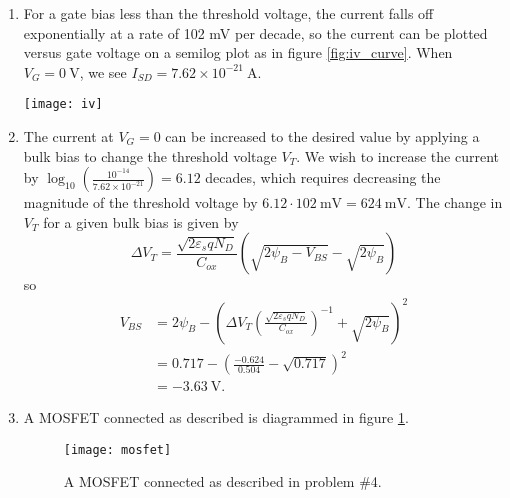 \documentclass{article}
\begin{document}
\begin{enumerate}
{\begin{align*}
                &= -1.746 ~\mathrm{V}.
        \end{align*} 
       }
   \item{For a gate bias less than the threshold voltage, the current falls 
         off exponentially at a rate of 102 mV per decade, so the current can 
         be plotted versus gate voltage on a semilog plot as in figure 
         \ref{fig:iv_curve}. When $V_G = 0 ~\mathrm{V}$, we see 
         $I_{SD} = 7.62 \times 10^{-21} ~\mathrm{A}$.
         \begin{sidewaysfigure}
           \texttt{[image: iv]}
           \caption{Drain current versus gate bias for problem \#4. \label{fig:iv_curve}}
         \end{sidewaysfigure}}
   \item{The current at $V_G = 0$ can be increased to the desired value by 
         applying a bulk bias to change the threshold voltage $V_T$. We wish to
         increase the current by 
         $\log_{10}\left(\frac{10^{-14}}{7.62 \times 10^{-21}}\right) = 6.12$ decades,
         which requires decreasing the magnitude of the threshold voltage by 
         $6.12 \cdot 102 ~\mathrm{mV} = 624 ~\mathrm{mV}$. The change in $V_T$ for a
         given bulk bias is given by
         $$
         \Delta V_{T} = \frac{\sqrt{2 \varepsilon_s q N_D}}
                               {C_{ox}}
                          (\sqrt{2 \psi_B - V_{BS}} - \sqrt{2 \psi_B}) 
         $$
         so
         \begin{align*}
         V_{BS} &= 2\psi_B - \left(\Delta V_{T}\left(\frac{\sqrt{2 \varepsilon_s q N_D}}{C_{ox}}\right)^{-1} + \sqrt{2 \psi_B}\right)^2 \\
                &= 0.717 - \left(\frac{-0.624}{0.504} - \sqrt{0.717}\right)^2 \\
                &= -3.63 ~\mathrm{V}.
         \end{align*}
        }
        \item{ A MOSFET connected as described is diagrammed in figure \ref{fig:mosfet}.
               \begin{figure}
                 \texttt{[image: mosfet]}
                 \caption{A MOSFET connected as described in problem \#4. \label{fig:mosfet}}
               \end{figure}
             }
\end{enumerate}

\pagebreak
\end{document}
